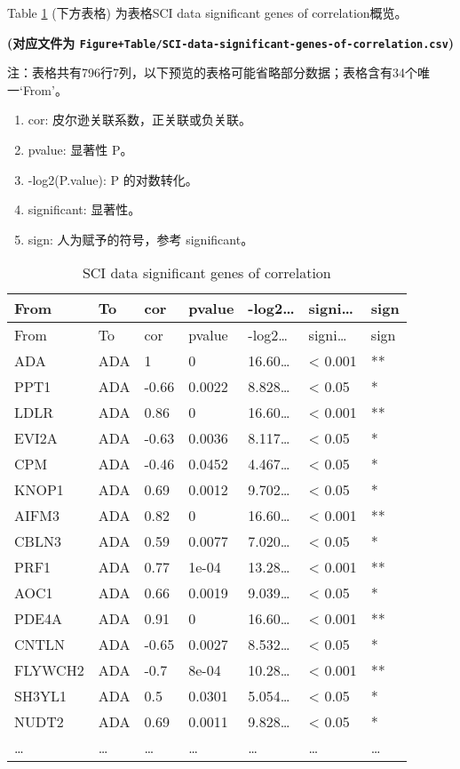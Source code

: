 \documentclass[
]{article}
\providecommand{\tightlist}{%
  \setlength{\itemsep}{0pt}\setlength{\parskip}{0pt}}
\begin{document}
Table \ref{tab:SCI-data-significant-genes-of-correlation} (下方表格) 为表格SCI data significant genes of correlation概览。

\textbf{(对应文件为 \texttt{Figure+Table/SCI-data-significant-genes-of-correlation.csv})}

\begin{center}\begin{tcolorbox}[colback=gray!10, colframe=gray!50, width=0.9\linewidth, arc=1mm, boxrule=0.5pt]注：表格共有796行7列，以下预览的表格可能省略部分数据；表格含有34个唯一`From'。
\end{tcolorbox}
\end{center}
\begin{center}\begin{tcolorbox}[colback=gray!10, colframe=gray!50, width=0.9\linewidth, arc=1mm, boxrule=0.5pt]\begin{enumerate}\tightlist
\item cor: 皮尔逊关联系数，正关联或负关联。
\item pvalue: 显著性 P。
\item -log2(P.value): P 的对数转化。
\item significant: 显著性。
\item sign: 人为赋予的符号，参考 significant。
\end{enumerate}\end{tcolorbox}
\end{center}

\begin{longtable}[]{@{}lllllll@{}}
\caption{\label{tab:SCI-data-significant-genes-of-correlation}SCI data significant genes of correlation}\tabularnewline
\toprule
From & To & cor & pvalue & -log2\ldots{} & signi\ldots{} & sign\tabularnewline
\midrule
\endfirsthead
\toprule
From & To & cor & pvalue & -log2\ldots{} & signi\ldots{} & sign\tabularnewline
\midrule
\endhead
ADA & ADA & 1 & 0 & 16.60\ldots{} & \textless{} 0.001 & **\tabularnewline
PPT1 & ADA & -0.66 & 0.0022 & 8.828\ldots{} & \textless{} 0.05 & *\tabularnewline
LDLR & ADA & 0.86 & 0 & 16.60\ldots{} & \textless{} 0.001 & **\tabularnewline
EVI2A & ADA & -0.63 & 0.0036 & 8.117\ldots{} & \textless{} 0.05 & *\tabularnewline
CPM & ADA & -0.46 & 0.0452 & 4.467\ldots{} & \textless{} 0.05 & *\tabularnewline
KNOP1 & ADA & 0.69 & 0.0012 & 9.702\ldots{} & \textless{} 0.05 & *\tabularnewline
AIFM3 & ADA & 0.82 & 0 & 16.60\ldots{} & \textless{} 0.001 & **\tabularnewline
CBLN3 & ADA & 0.59 & 0.0077 & 7.020\ldots{} & \textless{} 0.05 & *\tabularnewline
PRF1 & ADA & 0.77 & 1e-04 & 13.28\ldots{} & \textless{} 0.001 & **\tabularnewline
AOC1 & ADA & 0.66 & 0.0019 & 9.039\ldots{} & \textless{} 0.05 & *\tabularnewline
PDE4A & ADA & 0.91 & 0 & 16.60\ldots{} & \textless{} 0.001 & **\tabularnewline
CNTLN & ADA & -0.65 & 0.0027 & 8.532\ldots{} & \textless{} 0.05 & *\tabularnewline
FLYWCH2 & ADA & -0.7 & 8e-04 & 10.28\ldots{} & \textless{} 0.001 & **\tabularnewline
SH3YL1 & ADA & 0.5 & 0.0301 & 5.054\ldots{} & \textless{} 0.05 & *\tabularnewline
NUDT2 & ADA & 0.69 & 0.0011 & 9.828\ldots{} & \textless{} 0.05 & *\tabularnewline
\ldots{} & \ldots{} & \ldots{} & \ldots{} & \ldots{} & \ldots{} & \ldots{}\tabularnewline
\bottomrule
\end{longtable}
\end{document}
